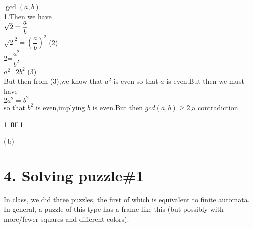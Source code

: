\documentclass{knittingpattern}
\begin{document}
\begin{flushleft}
$ {\gcd(a,b)}$=\\
 1.Then we have \\
\hspace{6.5cm}  
\vspace{0.2cm}
 $\sqrt{2} = \Large{\dfrac{a}{b}}$\\
\vspace{0.2cm}
\hspace{6.5cm} 
$\sqrt{2}^2 = (\dfrac{a}{b})^2$ \hspace{5cm} (2)\\
\vspace{0.2cm}
\hspace{6.5cm} 
2=\large{$\dfrac{a^2}{b^2}$}\vspace{0.3cm}\\
\hspace{6.5cm}  $a^2$=$2b^2$ \hspace{6cm} (3)\\
\vspace{0.2cm}
 But then from (3),we know that $a^2$ is even so that $a$ is even.But then we must have \\ \vspace{0.2cm}  \hspace{5cm} $ 2a^2 = b^2 $\\
\vspace{0.2cm} 
 so that $b^2$ is even,implying $b$ is even.But then {$gcd(a,b)\ge 2 $},a contradiction.
  \hspace{3cm}
  \framebox[3mm][h]{} \\
\end{flushleft}

\vspace{3cm}
\hspace{13cm}\textbf{1 0f 1}
\newpage
\noindent{}
\hline
\usetikzlibrary{automata, positioning,arrows}

(\,b)\,
\section*{4. Solving puzzle\#1}In class, we did three puzzles, the first of which is equivalent to
finite automata. In general, a puzzle of this type has a frame like this (but possibly
with more/fewer squares and different colors):
\end{document}
